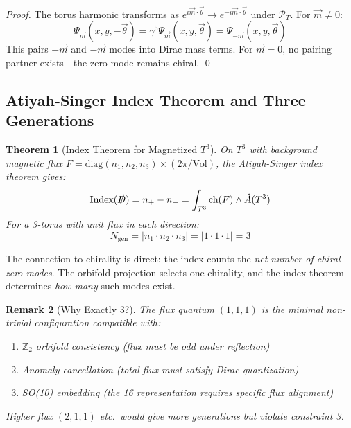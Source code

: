\documentclass[12pt,a4paper]{article}
\newtheorem{theorem}{Theorem}[section]
\newtheorem{remark}[theorem]{Remark}
\begin{document}
\begin{proof}
The torus harmonic transforms as $e^{i\vec{m}\cdot\vec{\theta}} \to e^{-i\vec{m}\cdot\vec{\theta}}$ under $\mathcal{P}_T$. For $\vec{m} \neq 0$:
\begin{equation}
\Psi_{\vec{m}}(x,y,-\vec{\theta}) = \gamma^5 \Psi_{\vec{m}}(x,y,\vec{\theta}) = \Psi_{-\vec{m}}(x,y,\vec{\theta})
\end{equation}
This pairs $+\vec{m}$ and $-\vec{m}$ modes into Dirac mass terms. For $\vec{m} = 0$, no pairing partner exists---the zero mode remains chiral. \qed
\end{proof}

\subsection{Atiyah-Singer Index Theorem and Three Generations}

\begin{theorem}[Index Theorem for Magnetized $T^3$]
On $T^3$ with background magnetic flux $F = \text{diag}(n_1, n_2, n_3) \times (2\pi/\text{Vol})$, the Atiyah-Singer index theorem gives:
\begin{equation}
\text{Index}(\slashed{D}) = n_+ - n_- = \int_{T^3} \text{ch}(F) \wedge \hat{A}(T^3)
\end{equation}
For a 3-torus with unit flux in each direction:
\begin{equation}
\boxed{N_{\text{gen}} = |n_1 \cdot n_2 \cdot n_3| = |1 \cdot 1 \cdot 1| = 3}
\end{equation}
\end{theorem}

The connection to chirality is direct: the index counts the \textit{net number of chiral zero modes}. The orbifold projection selects one chirality, and the index theorem determines \textit{how many} such modes exist.

\begin{remark}[Why Exactly 3?]
The flux quantum $(1,1,1)$ is the \textit{minimal non-trivial} configuration compatible with:
\begin{enumerate}
    \item $\mathbb{Z}_2$ orbifold consistency (flux must be odd under reflection)
    \item Anomaly cancellation (total flux must satisfy Dirac quantization)
    \item SO(10) embedding (the 16 representation requires specific flux alignment)
\end{enumerate}
Higher flux $(2,1,1)$ etc.\ would give more generations but violate constraint 3.
\end{remark}
\end{document}
